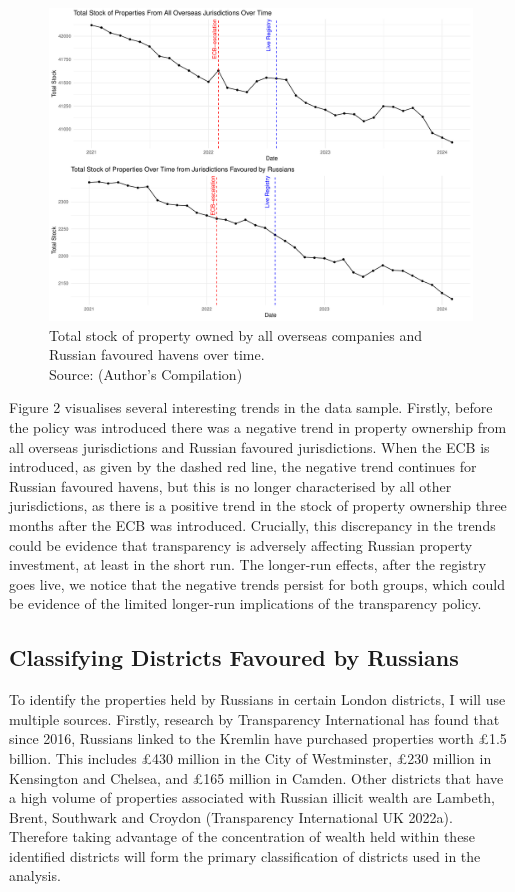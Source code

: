 \documentclass{article}
\begin{document}
\begin{figure}[H]
    \centering
    \includegraphics[width=\textwidth]{Rplot02.pdf}
    \caption{Total stock of property owned by all overseas companies and Russian favoured havens over time.\\ Source: (Author's Compilation)}
    \label{fig:enter-label}
\end{figure}

Figure 2 visualises several interesting trends in the data sample. Firstly, before the policy was introduced there was a negative trend in property ownership from all overseas jurisdictions and Russian favoured jurisdictions. When the ECB is introduced, as given by the dashed red line, the negative trend continues for Russian favoured havens, but this is no longer characterised by all other jurisdictions, as there is a positive trend in the stock of property ownership three months after the ECB was introduced. Crucially, this discrepancy in the trends could be evidence that transparency is adversely affecting Russian property investment, at least in the short run. The longer-run effects, after the registry goes live, we notice that the negative trends persist for both groups, which could be evidence of the limited longer-run implications of the transparency policy.
\newpage

\subsection{Classifying Districts Favoured by Russians}
To identify the properties held by Russians in certain London districts, I will use multiple sources. Firstly, research by Transparency International has found that since 2016, Russians linked to the Kremlin have purchased properties worth £1.5 billion. This includes £430 million in the City of Westminster, £230 million in Kensington and Chelsea, and £165 million in Camden. Other districts that have a high volume of properties associated with Russian illicit wealth are Lambeth, Brent, Southwark and Croydon (Transparency International UK 2022a). Therefore taking advantage of the concentration of wealth held within these identified districts will form the primary classification of districts used in the analysis.
\end{document}
